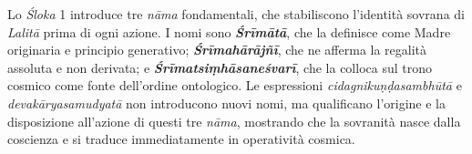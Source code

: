 Lo \textit{Śloka} 1 introduce tre \textit{nāma} fondamentali, che stabiliscono l’identità sovrana di \textit{Lalitā} prima di ogni azione. I nomi sono \textbf{\textit{Śrīmātā}}, che la definisce come Madre originaria e principio generativo; \textbf{\textit{Śrīmahārājñī}}, che ne afferma la regalità assoluta e non derivata; e \textbf{\textit{Śrīmatsiṃhāsaneśvarī}}, che la colloca sul trono cosmico come fonte dell’ordine ontologico. Le espressioni \textit{cidagnikuṇḍasambhūtā} e \textit{devakāryasamudyatā} non introducono nuovi nomi, ma qualificano l’origine e la disposizione all’azione di questi tre \textit{nāma}, mostrando che la sovranità nasce dalla coscienza e si traduce immediatamente in operatività cosmica.
